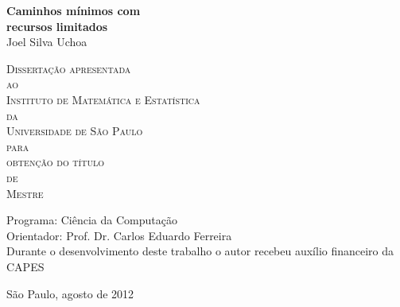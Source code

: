\documentclass[12pt,twoside,a4paper]{book}
\begin{document}
\frontmatter 
\fancyhead[RO]{{\footnotesize\rightmark}\hspace{2em}\thepage}
\setcounter{tocdepth}{2}
\fancyhead[LE]{\thepage\hspace{2em}\footnotesize{\leftmark}}
\fancyhead[RE,LO]{}
\fancyhead[RO]{{\footnotesize\rightmark}\hspace{2em}\thepage}

\onehalfspacing  %

\thispagestyle{empty}
\begin{center}
    \vspace*{2.3cm}
    \textbf{\Large{Caminhos mínimos com\\
                   recursos limitados}}\\
    
    \vspace*{1.2cm}
    \Large{Joel Silva Uchoa}
    
    \vskip 2cm
    \textsc{
    Dissertação apresentada\\[-0.25cm] 
    ao\\[-0.25cm]
    Instituto de Matemática e Estatística\\[-0.25cm]
    da\\[-0.25cm]
    Universidade de São Paulo\\[-0.25cm]
    para\\[-0.25cm]
    obtenção do título\\[-0.25cm]
    de\\[-0.25cm]
    Mestre}
    
    \vskip 1.5cm
    Programa: Ciência da Computação\\
    Orientador: Prof. Dr. Carlos Eduardo Ferreira\\

   	\vskip 1cm
    \normalsize{Durante o desenvolvimento deste trabalho o autor recebeu auxílio
    financeiro da CAPES}
    
    \vskip 0.5cm
    \normalsize{São Paulo, agosto de 2012}
\end{center}

%
\end{document}
